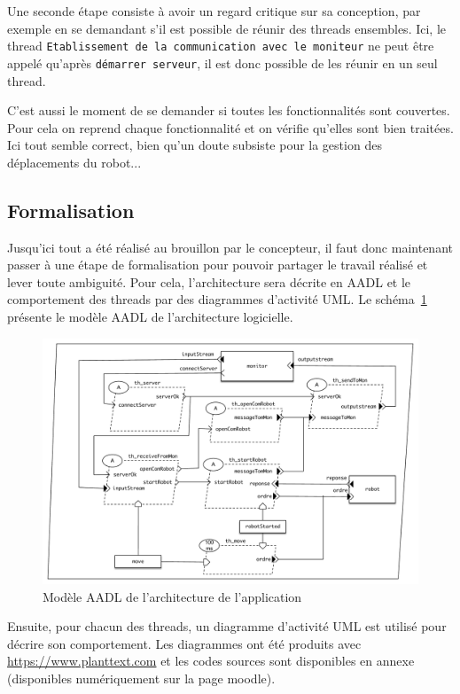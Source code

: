 \documentclass[11pt,a4paper]{paper}
\begin{document}
Une seconde étape consiste à avoir un regard critique sur sa conception, par exemple en se demandant s'il est possible de réunir des threads ensembles. Ici, le thread {\tt Etablissement de la communication avec le moniteur} ne peut être appelé qu'après {\tt démarrer serveur}, il est donc possible de les réunir en un seul thread.

C'est aussi le moment de se demander si toutes les fonctionnalités sont couvertes. Pour cela on reprend chaque fonctionnalité et on vérifie qu'elles sont bien traitées. Ici tout semble correct, bien qu'un doute subsiste pour la gestion des déplacements du robot...

\subsection{Formalisation}

Jusqu'ici tout a été réalisé au brouillon par le concepteur, il faut donc maintenant passer à une étape de formalisation pour pouvoir partager le travail réalisé et lever toute ambiguité. Pour cela, l'architecture sera décrite en AADL et le comportement des threads par des diagrammes d'activité UML. Le schéma~\ref{fig:AADL} présente le modèle AADL de l'architecture logicielle.

 \begin{figure}[htbp]
\begin{center}
\includegraphics[scale=0.5]{figures_pdf/fonc/AADL}
\end{center}
\caption{Modèle AADL de l'architecture de l'application}
\label{fig:AADL}
\end{figure}
\FloatBarrier

Ensuite, pour chacun des threads, un diagramme d'activité UML est utilisé pour décrire son comportement. Les diagrammes ont été produits avec \href{https://www.planttext.com}{https://www.planttext.com} et les codes sources sont disponibles en annexe (disponibles numériquement sur la page moodle).
\end{document}
